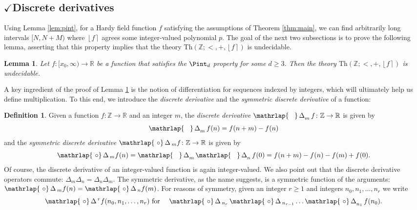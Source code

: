 \documentclass{amsart}
\newtheorem{lemma}[theorem]{Lemma}
\theoremstyle{definition}
\newtheorem{definition}[theorem]{Definition}
\newcommand{\nint}[1]{\left\lfloor #1 \right\rceil}
\newcommand{\ZZ}{\mathbb{Z}}
\newcommand{\RR}{\mathbb{R}}
\newcommand{\DeltaS}{\operatorname{\mathrlap{\ \circ}\operatorname{\Delta}}}
\newcommand{\DeltaT}{\operatorname{\mathrlap{\ \phantom{\circ}}\operatorname{\Delta}}}
\newcommand{\theory}[1]{\mathrm{Th}(#1)}
\begin{document}
\subsection{$\checkmark$Discrete derivatives}
\label{subsec:discrete-derivatives}

Using Lemma \ref{lem:pint}, for a Hardy field function $f$ satisfying the assumptions of Theorem \ref{thm:main}, we can find arbitrarily long intervals $[N,N+M)$ where $\nint{f}$ agrees some integer-valued polynomial $p$. The goal of the next two subsections is to prove the following lemma, asserting that this property implies that the theory $\theory{\ZZ;<,+,\nint{f}}$ is undecidable.

\begin{lemma}
\label{lem:pd-to-undecidable}
Let $f \colon [x_0,\infty) \to \RR$ be a function that satisfies the $\Pint_d$ property for some $d \geq 3$. Then the theory $\theory{\ZZ; <, +, \nint{f}}$ is undecidable.
\end{lemma}

A key ingredient of the proof of Lemma \ref{lem:pd-to-undecidable} is the notion of differentiation for sequences indexed by integers, which will ultimately help us define multiplication. To this end, we introduce the \emph{discrete derivative} and the \emph{symmetric discrete derivative} of a function:

\begin{definition}

Given a function $f \colon \ZZ \to \RR$ and an integer $m$, the \emph{discrete derivative} $\DeltaT_m f \colon \ZZ \to \RR$ is given by
\begin{equation*}
\DeltaT_m f(n) = f(n+m) - f(n)
\end{equation*}
and the \emph{symmetric discrete derivative} $\DeltaS{}_m f \colon \ZZ \to \RR$ is given by
\begin{equation*}
\DeltaS{}_m f(n) = \DeltaT_m \DeltaT_n f(0) = f(n+m) - f(n) - f(m) + f(0).
\end{equation*}
Of course, the discrete derivative of an integer-valued function is again integer-valued. We also point out that the discrete derivative operators commute: $\Delta_m \Delta_n = \Delta_n \Delta_m$. The symmetric derivative, as the name suggests, is a symmetric function of the arguments: $\DeltaS{}_m f(n) = \DeltaS{}_n f(m)$.
For reasons of symmetry, given an integer $r \geq 1$ and integers $n_0, n_1, \dots, n_r$ we write
\begin{eqnarray*}
\DeltaS{}^r f(n_0, n_1, \dots, n_r) & \text{ for } & \DeltaS{}_{n_r} \DeltaS{}_{n_{r-1}} \dots \DeltaS_{n_1} f(n_0).
\end{eqnarray*}
\end{definition}
\end{document}
